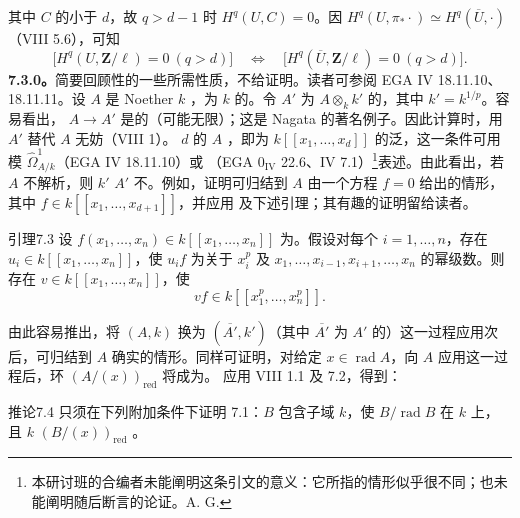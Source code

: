 其中 $C$ 的小于 $d$，故 $q>d-1$ 时 $H^q(U,C)=0$。因 $H^q(U,\pi_*\cdot)\simeq H^q(\overline U,\cdot)$（VIII 5.6），可知
\[\bigl[H^q(U,\mathbf Z/\ell)=0\ (q>d)\bigr]\quad\Longleftrightarrow\quad\bigl[H^q(\overline U,\mathbf Z/\ell)=0\ (q>d)\bigr].\tag{7.2}\]
\textbf{7.3.0。}简要回顾性的一些所需性质，不给证明。读者可参阅 EGA IV 18.11.10、18.11.11。设 $A$ 是 Noether  $k$ ，为 $k$ 的。令 $A'$ 为 $A\otimes_kk'$ 的，其中 $k'=k^{1/p}$。容易看出， $A\to A'$ 是的（可能无限）；这是 Nagata 的著名例子。因此计算时，用 $A'$ 替代 $A$ 无妨（VIII 1）。
 $d$ 的 $A$ ，即为 $k[[x_1,\ldots,x_d]]$ 的泛，这一条件可用模 $\widehat\Omega^1_{A/k}$（EGA IV 18.11.10）或 
（EGA $0_{\mathrm{IV}}$ 22.6、IV 7.1）\footnote{本研讨班的合编者未能阐明这条引文的意义：它所指的情形似乎很不同；也未能阐明随后断言的论证。A. G.}表述。由此看出，若 $A$ 不解析，则 $k'$  $A'$ 不。例如，证明可归结到 $A$ 由一个方程 $f=0$ 给出的情形，其中 $f\in k[[x_1,\ldots,x_{d+1}]]$，并应用 及下述引理；其有趣的证明留给读者。
\begin{SGAresult}{引理}{7.3}
设 $f(x_1,\ldots,x_n)\in k[[x_1,\ldots,x_n]]$ 为。假设对每个 $i=1,\ldots,n$，存在 $u_i\in k[[x_1,\ldots,x_n]]$，使 $u_if$ 为关于 $x_i^p$ 及 $x_1,\ldots,x_{i-1},x_{i+1},\ldots,x_n$ 的幂级数。则存在 $v\in k[[x_1,\ldots,x_n]]$，使
\[vf\in k[[x_1^p,\ldots,x_n^p]].\]
\end{SGAresult}
由此容易推出，将 $(A,k)$ 换为 $(\overline{A'},k')$（其中 $\overline{A'}$ 为 $A'$ 的）这一过程应用次后，可归结到 $A$ 确实的情形。同样可证明，对给定 $x\in\operatorname{rad}A$，向 $A$ 应用这一过程后，环 $(A/(x))_{\mathrm{red}}$ 将成为。
应用 VIII 1.1 及 7.2，得到：
\begin{SGAresult}{推论}{7.4}
只须在下列附加条件下证明 7.1：$B$ 包含子域 $k$，使 $B/\operatorname{rad}B$ 在 $k$ 上，且 $k$  $(B/(x))_{\mathrm{red}}$ 。
\end{SGAresult}
